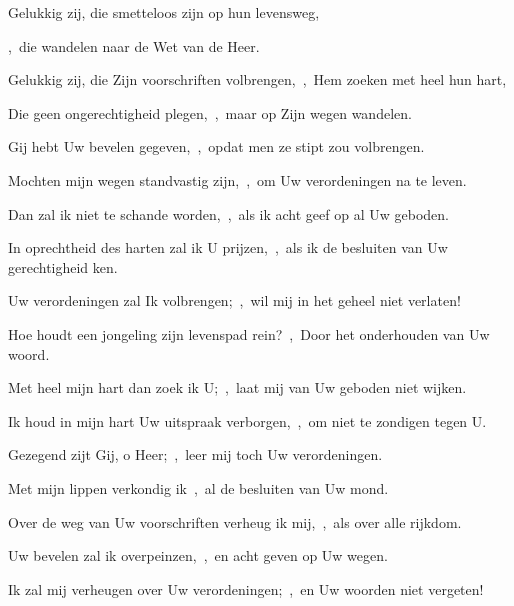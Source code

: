 \documentclass[12pt,twoside,a5paper]{article}
\begin{document}
\begin{halfparskip}
  Gelukkig zij, die smetteloos zijn op hun levensweg,


  \sep\ die wandelen naar de Wet van de Heer.

  Gelukkig zij, die Zijn voorschriften volbrengen,~\sep\ Hem zoeken met heel hun hart,

  Die geen ongerechtigheid plegen,~\sep\ maar op Zijn wegen wandelen.

  Gij hebt Uw bevelen gegeven,~\sep\ opdat men ze stipt zou volbrengen.

  Mochten mijn wegen standvastig zijn,~\sep\ om Uw verordeningen na te leven.

  Dan zal ik niet te schande worden,~\sep\ als ik acht geef op al Uw geboden.

  In oprechtheid des harten zal ik U prijzen,~\sep\ als ik de besluiten van Uw gerechtigheid ken.

  Uw verordeningen zal Ik volbrengen;~\sep\ wil mij in het geheel niet verlaten!

  Hoe houdt een jongeling zijn levenspad rein?~\sep\ Door het onderhouden van Uw woord.

  Met heel mijn hart dan zoek ik U;~\sep\ laat mij van Uw geboden niet wijken.

  Ik houd in mijn hart Uw uitspraak verborgen,~\sep\ om niet te zondigen tegen U.

  Gezegend zijt Gij, o Heer;~\sep\ leer mij toch Uw verordeningen.

  Met mijn lippen verkondig ik~\sep\ al de besluiten van Uw mond.

  Over de weg van Uw voorschriften verheug ik mij,~\sep\ als over alle rijkdom.

  Uw bevelen zal ik overpeinzen,~\sep\ en acht geven op Uw wegen.

  Ik zal mij verheugen over Uw verordeningen;~\sep\ en Uw woorden niet vergeten!
\end{halfparskip}

\end{document}
